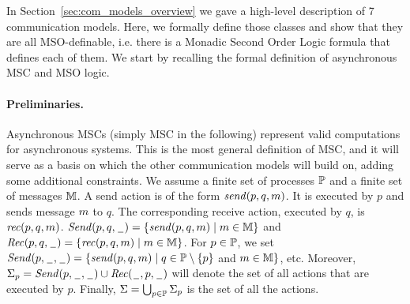 

In Section~\ref{sec:com_models_overview} we gave a high-level description of 7 communication models. Here, we formally define those classes and  show that they are all MSO-definable, i.e. there is a Monadic Second Order Logic formula that defines each of them. 
We start by  recalling the formal definition of asynchronous MSC and MSO logic.

\paragraph{\bf Preliminaries.}
Asynchronous MSCs (simply MSC in the following) represent valid computations for asynchronous systems. This is the most general definition of MSC, and it will serve as a basis on which the other communication models will build on,  adding some additional constraints. We assume a finite set of processes $\mathbb{P}$ and a finite set of messages $\mathbb{M}$. A send action is of the form $\mathit{send}(p, q, m)$.
It is executed by $p$ and sends message $m$ to $q$.
The corresponding receive action, executed by $q$, is
$\mathit{rec}(p, q, m)$.
%
${\mathit{Send}(p,q,\hspace{0.1em}\underline{\hspace{0.5em}}\hspace{0.1em})} = \{\mathit{send}(p, q, m) \mid m \in \mathbb{M}\}$ and
${\mathit{Rec}(p,q,\hspace{0.1em}\underline{\hspace{0.5em}}\hspace{0.1em})} = \{\mathit{rec}(p, q, m) \mid m \in \mathbb{M}\}$.
For $p \in \mathbb{P}$, we set
${\mathit{Send}(p,\hspace{0.1em}\underline{\hspace{0.5em}}\hspace{0.1em},\hspace{0.1em}\underline{\hspace{0.5em}}\hspace{0.1em})} = \{\mathit{send}(p, q, m) \mid q \in \mathbb{P} \setminus \{p\}$ and $m \in \mathbb{M}\}$, etc.
Moreover, $\Sigma_{p} = {\mathit{Send}(p,\hspace{0.1em}\underline{\hspace{0.5em}}\hspace{0.1em},\hspace{0.1em}\underline{\hspace{0.5em}}\hspace{0.1em})} \cup {\mathit{Rec}(\hspace{0.1em}\underline{\hspace{0.5em}}\hspace{0.1em},p,\hspace{0.1em}\underline{\hspace{0.5em}}\hspace{0.1em})}$ will denote the set of all actions that are
executed by $p$.
Finally, $\Sigma = \bigcup_{p \in \mathbb{P}} \Sigma_{p}$
is the set of all the actions.


